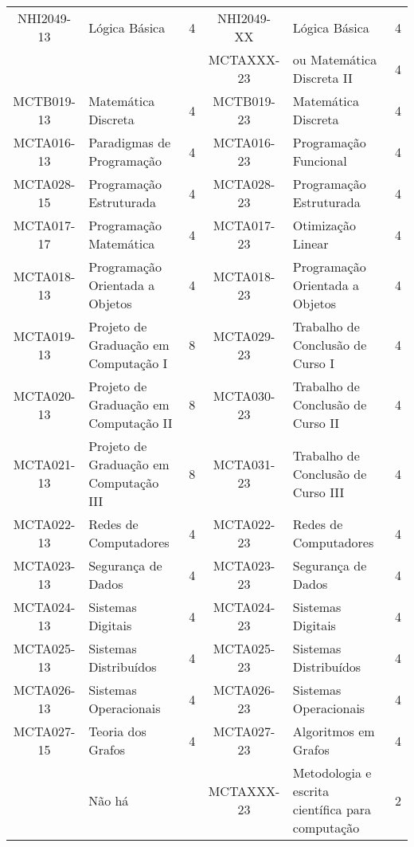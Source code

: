 \begin{table}[h!]
{\begin{tabular}{|c|p{}|c||c|p{}|c|}
			NHI2049-13 & Lógica Básica & 4 & NHI2049-XX & Lógica Básica & 4 \\
			& & & MCTAXXX-23 & ou Matemática Discreta II & 4 \\ \hline
			MCTB019-13 & Matemática Discreta & 4 & MCTB019-23 & Matemática Discreta & 4 \\ \hline
			MCTA016-13 & Paradigmas de Programação & 4 & MCTA016-23 & Programação Funcional & 4 \\ \hline
			MCTA028-15 & Programação Estruturada & 4 & MCTA028-23 & Programação Estruturada & 4 \\ \hline
			MCTA017-17 & Programação Matemática & 4 & MCTA017-23 & Otimização Linear & 4 \\ \hline
			MCTA018-13 & Programação Orientada a Objetos & 4 & MCTA018-23 & Programação Orientada a Objetos & 4 \\ \hline
			MCTA019-13 & Projeto de Graduação em Computação I & 8 & MCTA029-23 & Trabalho de Conclusão de Curso I & 4 \\ \hline
			MCTA020-13 & Projeto de Graduação em Computação II & 8 & MCTA030-23 & Trabalho de Conclusão de Curso II & 4 \\ \hline
			MCTA021-13 & Projeto de Graduação em Computação III & 8 & MCTA031-23 & Trabalho de Conclusão de Curso III & 4 \\ \hline
			MCTA022-13 & Redes de Computadores & 4 & MCTA022-23 & Redes de Computadores & 4 \\ \hline
			MCTA023-13 & Segurança de Dados & 4 & MCTA023-23 & Segurança de Dados & 4 \\ \hline
			MCTA024-13 & Sistemas Digitais & 4 & MCTA024-23 & Sistemas Digitais & 4 \\ \hline
			MCTA025-13 & Sistemas Distribuídos & 4 & MCTA025-23 & Sistemas Distribuídos & 4 \\ \hline
			MCTA026-13 & Sistemas Operacionais & 4 & MCTA026-23 & Sistemas Operacionais & 4 \\ \hline
			MCTA027-15 & Teoria dos Grafos & 4 & MCTA027-23 & Algoritmos em Grafos & 4 \\ \hline
			& Não há & & MCTAXXX-23 & Metodologia e escrita científica para computação & 2 \\ \hline
		\end{tabular}
	}
\end{table}

